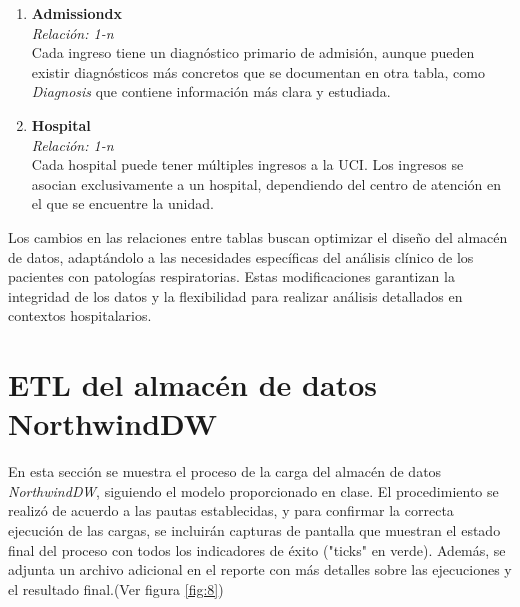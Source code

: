 \documentclass[12pt, a4paper, twoside]{article}
\begin{document}
\begin{enumerate}
		\item \textbf{Admissiondx} \\
		\textit{Relación: 1-n} \\
		Cada ingreso tiene un diagnóstico primario de admisión, aunque pueden existir diagnósticos  más concretos que se documentan en otra tabla, como \textit{Diagnosis} que contiene información más clara y estudiada.
		
		\item \textbf{Hospital} \\
		\textit{Relación: 1-n} \\
		Cada hospital puede tener múltiples ingresos a la UCI. Los ingresos se asocian exclusivamente a un hospital, dependiendo del centro de atención en el que se encuentre la unidad.
	\end{enumerate}

	

	
	Los cambios en las relaciones entre tablas buscan optimizar el diseño del almacén de datos, adaptándolo a las necesidades específicas del análisis clínico de los pacientes con patologías respiratorias. Estas modificaciones garantizan la integridad de los datos y la flexibilidad para realizar análisis detallados en contextos hospitalarios. 
	
	
	\section{ETL del almacén de datos NorthwindDW}
	
	En esta sección se muestra el proceso de la carga del almacén de datos \textit{NorthwindDW}, siguiendo el modelo proporcionado en clase. El procedimiento se realizó de acuerdo a las pautas establecidas, y para confirmar la correcta ejecución de las cargas, se incluirán capturas de pantalla que muestran el estado final del proceso con todos los indicadores de éxito ("ticks" en verde). Además, se adjunta un archivo adicional en el reporte con más detalles sobre las ejecuciones y el resultado final.(Ver figura \ref{fig:8})
	
\end{document}
